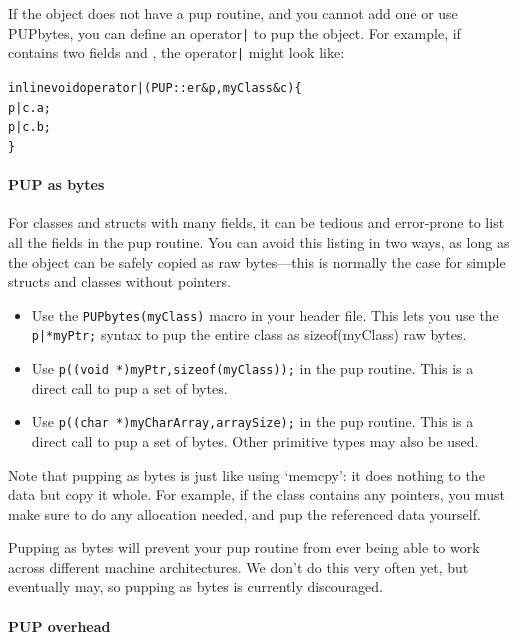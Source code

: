 If the object does not have a pup routine, and you cannot add one or use 
PUPbytes, you can define an operator\verb.|. to pup the object.
For example, if  contains two fields  and , the 
operator\verb.|. might look like:

\begin{alltt}
  inline void operator|(PUP::er &p,myClass &c) \{
    p|c.a;
    p|c.b;
  \}
\end{alltt}


\paragraph{PUP as bytes}
\label{sec:pupbytes}

For classes and structs with many fields, it can be tedious and 
error-prone to list all the fields in the pup routine.
You can avoid this listing in two ways, as long as the
object can be safely copied as raw bytes---this is normally 
the case for simple structs and classes without pointers.

\begin{itemize}
\item Use the \verb.PUPbytes(myClass). macro in your header file.
      This lets you use the \verb.p|*myPtr;. syntax 
      to pup the entire class as sizeof(myClass) raw bytes.

\item Use \verb.p((void *)myPtr,sizeof(myClass));. in the pup 
      routine.  This is a direct call to pup a set of bytes. 
      
\item Use \verb.p((char *)myCharArray,arraySize);. in the pup 
      routine.  This is a direct call to pup a set of bytes. 
	  Other primitive types may also be used.
      
\end{itemize}

Note that pupping as bytes is just like using `memcpy': 
it does nothing to the data but copy it whole.
For example, if the class contains any pointers, you
must make sure to do any allocation needed, and
pup the referenced data yourself.

Pupping as bytes will prevent your pup routine from 
ever being able to work across different machine 
architectures.  We don't do this very often yet, but 
eventually may, so pupping as bytes is currently discouraged.



\paragraph{PUP overhead}
\label{sec:pupoverhead}

